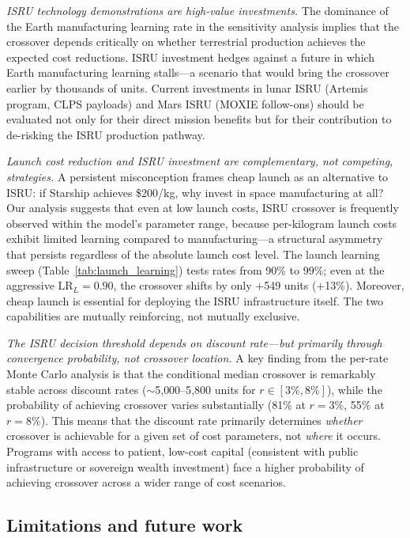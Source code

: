 \documentclass[preprint,12pt]{elsarticle}
\begin{document}
\emph{ISRU technology demonstrations are high-value investments.} The dominance of the Earth manufacturing learning rate in the sensitivity analysis implies that the crossover depends critically on whether terrestrial production achieves the expected cost reductions. ISRU investment hedges against a future in which Earth manufacturing learning stalls---a scenario that would bring the crossover earlier by thousands of units. Current investments in lunar ISRU (Artemis program, CLPS payloads) and Mars ISRU (MOXIE follow-ons) should be evaluated not only for their direct mission benefits but for their contribution to de-risking the ISRU production pathway.

\emph{Launch cost reduction and ISRU investment are complementary, not competing, strategies.} A persistent misconception frames cheap launch as an alternative to ISRU: if Starship achieves \$200/kg, why invest in space manufacturing at all? Our analysis suggests that even at low launch costs, ISRU crossover is frequently observed within the model's parameter range, because per-kilogram launch costs exhibit limited learning compared to manufacturing---a structural asymmetry that persists regardless of the absolute launch cost level. The launch learning sweep (Table~\ref{tab:launch_learning}) tests rates from 90\% to 99\%; even at the aggressive $\mathrm{LR}_L = 0.90$, the crossover shifts by only $+$549 units ($+$13\%). Moreover, cheap launch is essential for deploying the ISRU infrastructure itself. The two capabilities are mutually reinforcing, not mutually exclusive.

\emph{The ISRU decision threshold depends on discount rate---but primarily through convergence probability, not crossover location.} A key finding from the per-rate Monte Carlo analysis is that the conditional median crossover is remarkably stable across discount rates ($\sim$5{,}000--5{,}800 units for $r \in [3\%, 8\%]$), while the probability of achieving crossover varies substantially (81\% at $r = 3\%$, 55\% at $r = 8\%$). This means that the discount rate primarily determines \emph{whether} crossover is achievable for a given set of cost parameters, not \emph{where} it occurs. Programs with access to patient, low-cost capital (consistent with public infrastructure or sovereign wealth investment) face a higher probability of achieving crossover across a wider range of cost scenarios.

\subsection{Limitations and future work}
\end{document}
